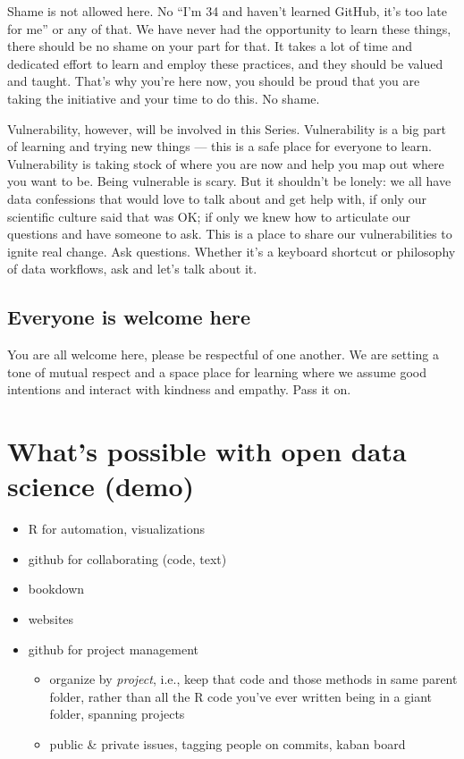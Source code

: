\documentclass[
  letterpaper,
  DIV=11,
  numbers=noendperiod]{scrreprt}
\providecommand{\tightlist}{%
  \setlength{\itemsep}{0pt}\setlength{\parskip}{0pt}}
\begin{document}
Shame is not allowed here. No ``I'm 34 and haven't learned GitHub, it's
too late for me'' or any of that. We have never had the opportunity to
learn these things, there should be no shame on your part for that. It
takes a lot of time and dedicated effort to learn and employ these
practices, and they should be valued and taught. That's why you're here
now, you should be proud that you are taking the initiative and your
time to do this. No shame.

Vulnerability, however, will be involved in this Series. Vulnerability
is a big part of learning and trying new things --- this is a safe place
for everyone to learn. Vulnerability is taking stock of where you are
now and help you map out where you want to be. Being vulnerable is
scary. But it shouldn't be lonely: we all have data confessions that
would love to talk about and get help with, if only our scientific
culture said that was OK; if only we knew how to articulate our
questions and have someone to ask. This is a place to share our
vulnerabilities to ignite real change. Ask questions. Whether it's a
keyboard shortcut or philosophy of data workflows, ask and let's talk
about it.

\hypertarget{everyone-is-welcome-here}{%
\subsection{Everyone is welcome here}\label{everyone-is-welcome-here}}

You are all welcome here, please be respectful of one another. We are
setting a tone of mutual respect and a space place for learning where we
assume good intentions and interact with kindness and empathy. Pass it
on.

\hypertarget{whats-possible-with-open-data-science-demo}{%
\section{What's possible with open data science
(demo)}\label{whats-possible-with-open-data-science-demo}}

\begin{itemize}
\tightlist
\item
  R for automation, visualizations
\item
  github for collaborating (code, text)
\item
  bookdown
\item
  websites
\item
  github for project management

  \begin{itemize}
  \tightlist
  \item
    organize by \emph{project}, i.e., keep that code and those methods
    in same parent folder, rather than all the R code you've ever
    written being in a giant folder, spanning projects
  \item
    public \& private issues, tagging people on commits, kaban board
  \end{itemize}
\end{itemize}
\end{document}
